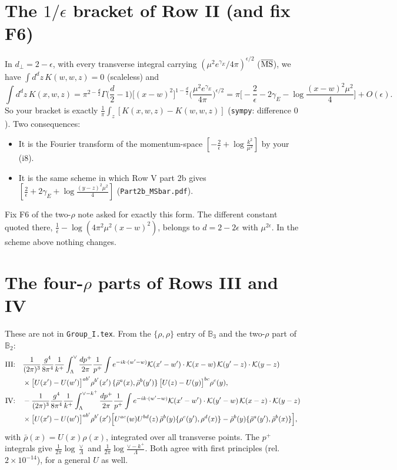 \documentclass[10pt]{article}
\numberwithin{equation}{section}
\def\mf#1{\mathbb{#1}}
\newcommand{\KK}{\mathcal K}
\begin{document}
\section{The \texorpdfstring{$1/\epsilon$}{1/epsilon} bracket of Row II (and fix F6)}\label{sec:F6}
In $d_\perp=2-\epsilon$, with every transverse integral carrying $(\mu^2e^{\gamma_E}/4\pi)^{\epsilon/2}$ ($\overline{\rm MS}$), we have $\int d^dz\,K(w,w,z)=0$ (scaleless) and
\begin{equation}
\int d^dz\,K(x,w,z)=\pi^{2-\frac d2}\Gamma\Big(\frac d2-1\Big)\big[(x-w)^2\big]^{1-\frac d2}\Big(\frac{\mu^2e^{\gamma_E}}{4\pi}\Big)^{\epsilon/2}=\pi\Big[-\frac2\epsilon-2\gamma_E-\log\frac{(x-w)^2\mu^2}{4}\Big]+O(\epsilon).
\end{equation}
So your bracket is exactly $\frac1\pi\int_z[K(x,w,z)-K(w,w,z)]$ (\texttt{sympy}: difference $0$). Two consequences:
\begin{itemize}
\item It is the Fourier transform of the momentum-space $[-\frac2\epsilon+\log\frac{k^2}{\mu^2}]$ by your (i8).
\item It is the same scheme in which Row V part 2b gives $[\frac2\epsilon+2\gamma_E+\log\frac{(y-z)^2\mu^2}{4}]$ (\texttt{Part2b\_MSbar.pdf}).
\end{itemize}
Fix F6 of the two-$\rho$ note asked for exactly this form. The different constant quoted there, $\frac1{\bar\epsilon}-\log(4\pi^2\mu^2(x-w)^2)$, belongs to $d=2-2\epsilon$ with $\mu^{2\epsilon}$. In the scheme above nothing changes.

\section{The four-\texorpdfstring{$\rho$}{rho} parts of Rows III and IV}\label{sec:four}
These are not in \texttt{Group\_I.tex}. From the $\{\rho,\rho\}$ entry of $\mf B_3$ and the two-$\rho$ part of $\mf B_2$:
\begin{align}
\text{III:}\quad&\frac{1}{(2\pi)^3}\frac{g^4}{8\pi^4}\frac{1}{k^+}\int_\Lambda^\vee\frac{dp^+}{2\pi}\frac{1}{p^+}\int e^{-ik\cdot(w'-w)}\KK(x'-w')\cdot\KK(x-w)\,\KK(y'-z)\cdot\KK(y-z)\notag\\
&\times\big[U(x')-U(w')\big]^{ab'}\rho^{b'}(x')\,\{\bar\rho^a(x),\bar\rho^b(y')\}\,\big[U(z)-U(y)\big]^{bc}\rho^c(y),\\
\text{IV:}\quad&-\frac{1}{(2\pi)^3}\frac{g^4}{8\pi^4}\frac{1}{k^+}\int_\Lambda^{\vee-k^+}\frac{dp^+}{2\pi}\frac{1}{p^+}\int e^{-ik\cdot(w'-w)}\KK(x'-w')\cdot\KK(y'-w)\,\KK(x-z)\cdot\KK(y-z)\notag\\
&\times\big[U(x')-U(w')\big]^{ab'}\rho^{b'}(x')\Big[U^{ac}(w)U^{bd}(z)\,\bar\rho^b(y)\{\rho^c(y'),\rho^d(x)\}-\bar\rho^b(y)\{\bar\rho^a(y'),\bar\rho^b(x)\}\Big],
\end{align}
with $\bar\rho(x)=U(x)\rho(x)$, integrated over all transverse points. The $p^+$ integrals give $\frac{1}{2\pi}\log\frac{\vee}{\Lambda}$ and $\frac{1}{2\pi}\log\frac{\vee-k^+}{\Lambda}$. Both agree with first principles (rel. $2\times10^{-14}$), for a general $U$ as well.
\end{document}
